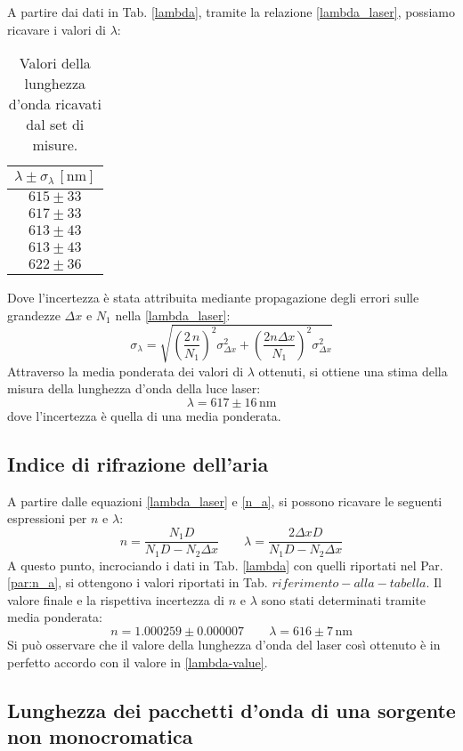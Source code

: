 \documentclass[]{article}
\let\oldsubsection\subsection%
\renewcommand{\subsection}{%
	\renewcommand{\theequation}{\thesubsection.\arabic{equation}}%
	\oldsubsection}%
\begin{document}
A partire dai dati in Tab. \ref{lambda}, tramite la relazione \ref{lambda_laser}, possiamo ricavare i valori di $\lambda$:

\begin{table}[H]
    \centering
    
    \begin{tabular}{||c||}
        \hline
        $\lambda \pm \sigma_{\lambda} \, \left[\text{nm}\right]$ \\
        \hline\hline

        $615 \pm 33$ \\\hline
        $617 \pm 33$ \\\hline
        $613 \pm 43$ \\\hline
        $613 \pm 43$ \\\hline
        $622 \pm 36$ \\\hline
    
    \end{tabular}
    \caption{Valori della lunghezza d'onda ricavati dal set di misure.}
    \label{tab:lambda}
\end{table}

Dove l'incertezza è stata attribuita mediante propagazione degli errori sulle grandezze $\Delta x$ e $N_1$ nella \ref{lambda_laser}:
\begin{equation}
\label{err-lambda}
\sigma_{\lambda} = \sqrt{ \left( \frac{2 \, n}{N_1}\right)^2 \sigma^2_{\Delta x} +  \left(\frac{2 n \Delta x}{N_1} \right)^2 \sigma^2_{\Delta x} }
\end{equation}
Attraverso la media ponderata dei valori di $\lambda$ ottenuti, si ottiene una stima della misura della lunghezza d'onda della luce laser:
\begin{equation}
\label{lambda-value}
\lambda = 617 \pm 16 \, \text{nm}
\end{equation}
dove l'incertezza è quella di una media ponderata.

\subsection{Indice di rifrazione dell'aria}

A partire dalle equazioni \ref{lambda_laser} e \ref{n_a}, si possono ricavare le seguenti espressioni per $n$ e $\lambda$:
\begin{equation}
    \label{rifrazione}
    n = \frac{N_1 D}{N_1 D - N_2 \Delta x} \qquad
    \lambda = \frac{2\Delta x D}{N_1 D - N_2 \Delta x}
\end{equation}
A questo punto, incrociando i dati in Tab. \ref{lambda} con quelli riportati nel Par. \ref{par:n_a}, si ottengono i valori riportati in Tab. $riferimento-alla-tabella$. Il valore finale e la rispettiva incertezza di $n$ e $\lambda$ sono stati determinati tramite media ponderata:
\begin{equation}
    \label{n_a-lambda}
    n = 1.000259 \pm 0.000007 \qquad
    \lambda = 616 \pm 7 \, \text{nm}
\end{equation}
Si può osservare che il valore della lunghezza d'onda del laser così ottenuto è in perfetto accordo con il valore in \ref{lambda-value}.

\subsection{Lunghezza dei pacchetti d'onda di una sorgente non monocromatica}
\end{document}
